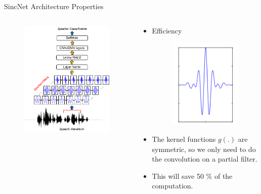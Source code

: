 \documentclass[11pt]{beamer}
\begin{document}
\begin{frame}{SincNet Architecture Properties}
	\begin{columns}
		\begin{column}{0.47\textwidth}
			\begin{figure}[H]
				\includegraphics[width=0.9\linewidth]{images/SincNet.png}
			\end{figure}
		\end{column}
		\begin{column}{0.5\textwidth}
			\begin{itemize}
				\item Efficiency
				\begin{figure}[H]
					\includegraphics[width=0.45\linewidth]{images/g_symmetric.png}
				\end{figure}
				\item 	The kernel functions $g(.)$ are symmetric, so we only need to do the convolution on a partial filter.
				\item This will save 50 \% of the computation.
			\end{itemize}
		\end{column}
	\end{columns}
\end{frame}
\end{document}
